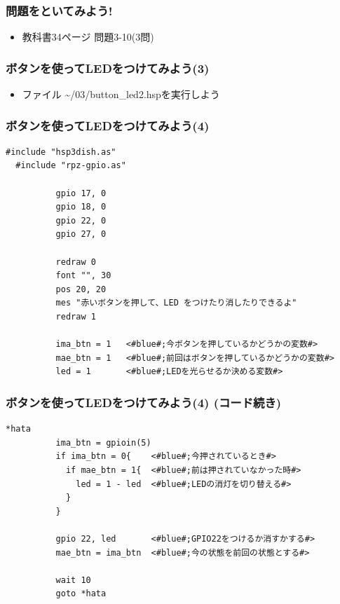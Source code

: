 \begin{frame}
  \frametitle{問題をといてみよう!}
  \begin{itemize}
    \item 教科書34ページ 問題3-10(3問)
  \end{itemize}
\end{frame}

\begin{frame}
  \frametitle{ボタンを使ってLEDをつけてみよう(3)}
  \begin{itemize}
    \item ファイル \rightarrow \sim/03/button\_led2.hspを実行しよう
  \end{itemize}
\end{frame}

\begin{frame}[fragile]
  \frametitle{ボタンを使ってLEDをつけてみよう(4)}
  \begin{lstlisting}[title=button\_led2.hsp, label=button_led2.hsp]
  #include "hsp3dish.as"
  #include "rpz-gpio.as"
  
          gpio 17, 0
          gpio 18, 0
          gpio 22, 0
          gpio 27, 0
        
          redraw 0
          font "", 30
          pos 20, 20
          mes "赤いボタンを押して、LED をつけたり消したりできるよ"
          redraw 1

          ima_btn = 1   <#blue#;今ボタンを押しているかどうかの変数#>
          mae_btn = 1   <#blue#;前回はボタンを押しているかどうかの変数#>
          led = 1       <#blue#;LEDを光らせるか決める変数#>
  \end{lstlisting}
\end{frame}

\begin{frame}[fragile]
  \frametitle{ボタンを使ってLEDをつけてみよう(4) (コード続き)}
  \begin{lstlisting}[title=button\_led2.hsp, label=button_led2.hsp]
  *hata
          ima_btn = gpioin(5)
          if ima_btn = 0{    <#blue#;今押されているとき#>
            if mae_btn = 1{  <#blue#;前は押されていなかった時#>
              led = 1 - led  <#blue#;LEDの消灯を切り替える#>
            }
          }

          gpio 22, led       <#blue#;GPIO22をつけるか消すかする#>
          mae_btn = ima_btn  <#blue#;今の状態を前回の状態とする#>

          wait 10
          goto *hata
  \end{lstlisting}
\end{frame}

